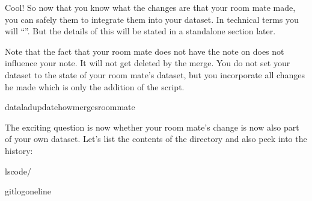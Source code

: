 \sphinxAtStartPar
Cool! So now that you know what the changes are that your room mate
made, you can safely  them to integrate
them into your dataset. In technical terms you will
“”.
But the details of this will be stated in a standalone section later.

\sphinxAtStartPar
Note that the fact that your room mate does not have the note
on  does not influence your note. It will not
get deleted by the merge. You do not set your dataset to the state
of your room mate’s dataset, but you incorporate all changes he made
\textendash{} which is only the addition of the script.

\begin{sphinxVerbatim}[commandchars=\\\{\}]
dataladupdate\PYGZhy{}\PYGZhy{}howmerge\PYGZhy{}sroommate
\end{sphinxVerbatim}

\sphinxAtStartPar
The exciting question is now whether your room mate’s change is now
also part of your own dataset. Let’s list the contents of the 
directory and also peek into the history:

\begin{sphinxVerbatim}[commandchars=\\\{\}]
lscode/
\end{sphinxVerbatim}

%
\begin{sphinxVerbatim}[commandchars=\\\{\}]
gitlog\PYGZhy{}\PYGZhy{}oneline
\end{sphinxVerbatim}
\sphinxresetverbatimhllines

